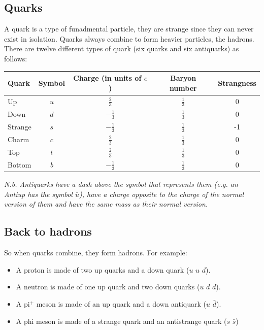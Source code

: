 \documentclass{article}
\begin{document}
\subsection*{Quarks}

A quark is a type of funadmental particle, they are strange since they can never
exist in isolation. Quarks always combine to form heavier particles, the
hadrons. There are twelve different types of quark (six quarks and six
antiquarks) as follows:

\begin{center}

	\renewcommand{\arraystretch}{1.2}
	\begin{tabular}{|l|c|c|c|c|}
		\hline
		Quark & Symbol & Charge (in units of $e$) & Baryon number & Strangness \\ 
		\hline

		Up & $u$ & $\frac{2}{3}$ & $\frac{1}{3}$ & 0 \\

		Down & $d$ & $-\frac{1}{3}$ & $\frac{1}{3}$ & 0 \\

		Strange & $s$ & $-\frac{1}{3}$ & $\frac{1}{3}$ & -1 \\

		Charm & $c$ & $\frac{2}{3}$ & $\frac{1}{3}$ & 0 \\

		Top & $t$ & $\frac{2}{3}$ & $\frac{1}{3}$ & 0 \\

		Bottom & $b$ & $-\frac{1}{3}$ & $\frac{1}{3}$ & 0 \\

		\hline

	\end{tabular}

\end{center}

{\it N.b. Antiquarks have a dash above the symbol that represents them (e.g. an
Antiup has the symbol $\bar{u}$), have a charge opposite to the charge of the
normal version of them and have the same mass as their normal version.}

\subsection*{Back to hadrons}
So when quarks combine, they form hadrons. For example:

\begin{itemize}
	
	\item A proton is made of two up quarks and a down quark ($u$ $u$ $d$).

	\item A neutron is made of one up quark and two down quarks ($u$ $d$ $d$).

	\item A pi$^+$ meson is made of an up quark and a down antiquark ($u$
	$\bar{d}$).

	\item A phi meson is made of a strange quark and an antistrange quark ($s$
	$\bar{s}$)

\end{itemize}
\end{document}

